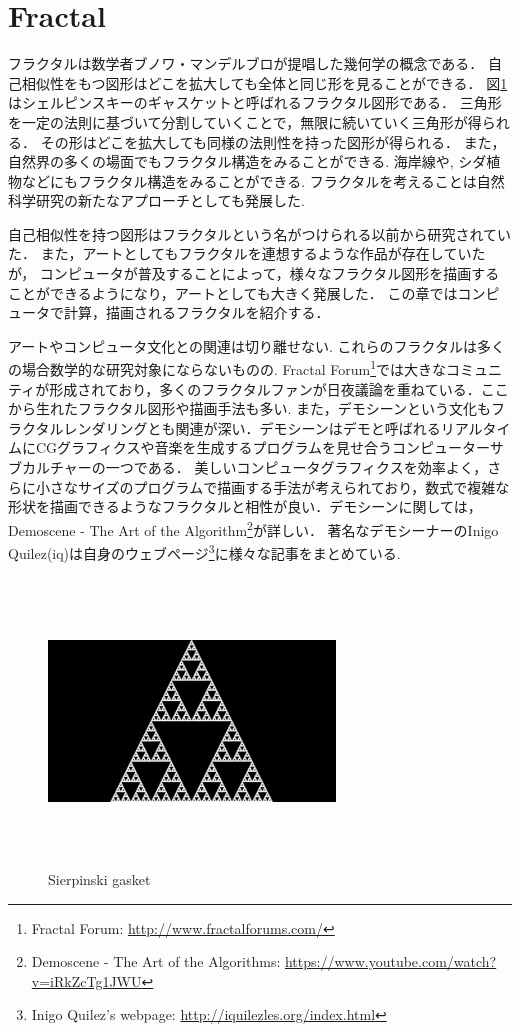 \section{Fractal}

フラクタルは数学者ブノワ・マンデルブロが提唱した幾何学の概念である．
自己相似性をもつ図形はどこを拡大しても全体と同じ形を見ることができる．
図\ref{fig:gasket}はシェルピンスキーのギャスケットと呼ばれるフラクタル図形である．
三角形を一定の法則に基づいて分割していくことで，無限に続いていく三角形が得られる．
その形はどこを拡大しても同様の法則性を持った図形が得られる．
また，自然界の多くの場面でもフラクタル構造をみることができる. 
海岸線や, シダ植物などにもフラクタル構造をみることができる. 
フラクタルを考えることは自然科学研究の新たなアプローチとしても発展した. 

自己相似性を持つ図形はフラクタルという名がつけられる以前から研究されていた．
また，アートとしてもフラクタルを連想するような作品が存在していたが，
コンピュータが普及することによって，様々なフラクタル図形を描画することができるようになり，アートとしても大きく発展した．
この章ではコンピュータで計算，描画されるフラクタルを紹介する．

アートやコンピュータ文化との関連は切り離せない. これらのフラクタルは多くの場合数学的な研究対象にならないものの.
Fractal Forum\footnote{Fractal Forum:  \url{http://www.fractalforums.com/}}では大きなコミュニティが形成されており，多くのフラクタルファンが日夜議論を重ねている．ここから生れたフラクタル図形や描画手法も多い. 
また，デモシーンという文化もフラクタルレンダリングとも関連が深い．デモシーンはデモと呼ばれるリアルタイムにCGグラフィクスや音楽を生成するプログラムを見せ合うコンピューターサブカルチャーの一つである．
美しいコンピュータグラフィクスを効率よく，さらに小さなサイズのプログラムで描画する手法が考えられており，数式で複雑な形状を描画できるようなフラクタルと相性が良い．デモシーンに関しては，Demoscene - The Art of the Algorithm\footnote{Demoscene - The Art of the Algorithms: \url{https://www.youtube.com/watch?v=iRkZcTg1JWU}}が詳しい．
著名なデモシーナーのInigo Quilez(iq)は自身のウェブページ\footnote{Inigo Quilez's webpage: \url{http://iquilezles.org/index.html}}に様々な記事をまとめている. 

\begin{figure}[htbp]
 \begin{center}
      \includegraphics[width=3in, height=3in, keepaspectratio]{../img/fractal/gasket.pdf}
    \caption{Sierpinski gasket}
    \label{fig:gasket}
 \end{center}
\end{figure}

